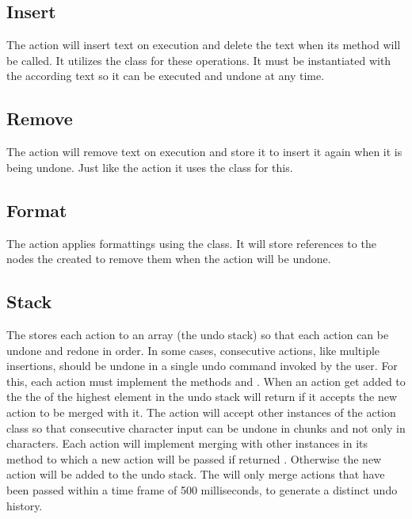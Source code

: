 \subsection{Insert}

The  action will insert text on execution and delete the text when its  method will be called. It utilizes the  class for these operations. It must be instantiated with the according text so it can be executed and undone at any time.

\subsection{Remove}

The  action will remove text on execution and store it to insert it again when it is being undone. Just like the  action it uses the  class for this.

\subsection{Format}

The  action applies formattings using the  class. It will store references to the nodes the  created to remove them when the action will be undone.

\subsection{Stack}

The  stores each action to an array (the undo stack) so that each action can be undone and redone in order. In some cases, consecutive actions, like multiple insertions, should be undone in a single undo command invoked by the user. For this, each action must implement the methods  and . When an action get added to the  the  of the highest element in the undo stack will return if it accepts the new action to be merged with it. The  action will accept other instances of the  action class so that consecutive character input can be undone in chunks and not only in characters. Each action will implement merging with other instances in its  method to which a new action will be passed if  returned . Otherwise the new action will be added to the undo stack. The  will only merge actions that have been passed within a time frame of 500 milliseconds, to generate a distinct undo history.

